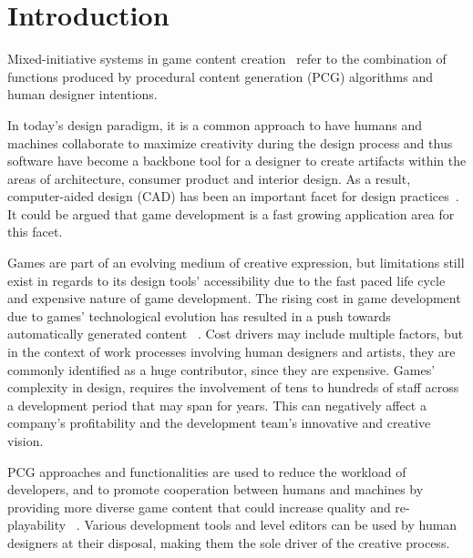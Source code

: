 \documentclass[sigconf]{acmart}
\begin{document}

\maketitle

\section{Introduction} 

Mixed-initiative systems in game content creation~ \cite{shaker_procedural_2016} refer to the combination of functions produced by procedural content generation (PCG) algorithms and human designer intentions. 

In today's design paradigm, it is a common approach to have humans and machines collaborate to maximize creativity during the design process and thus software have become a backbone tool for a designer to create artifacts within the areas of architecture, consumer product and interior design. As a result, computer-aided design (CAD) has been an important facet for design practices~\cite{yannakakis_mixed-initiative_2014}. It could be argued that game development is a fast growing application area for this facet.

Games are part of an evolving medium of creative expression, but limitations still exist in regards to its design tools’ accessibility due to the fast paced life cycle and expensive nature of game development. The rising cost in game development due to games’ technological evolution has resulted in a push towards automatically generated content ~\cite{yannakakis2018artificial,font_constrained_2016,Doherty2005-ji}. Cost drivers may include multiple factors, but in the context of work processes involving human designers and artists, they are commonly identified as a huge contributor, since they are expensive. Games' complexity in design, requires the involvement of tens to hundreds of staff across a development period that may span for years. This can negatively affect a company’s profitability and the development team’s innovative and creative vision. 

PCG approaches and functionalities are used to reduce the workload of developers, and to promote cooperation between humans and machines by providing more diverse game content that could increase quality and re-playability ~\cite{liapis_generating_2013,yannakakis2018artificial}. Various development tools and level editors can be used by human designers at their disposal, making them the sole driver of the creative process. 
\end{document}
